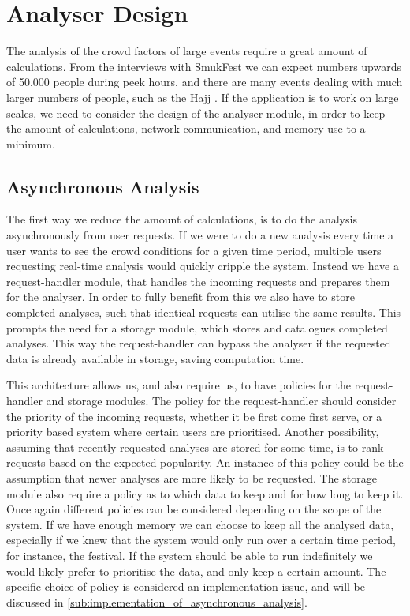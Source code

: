 \section{Analyser Design}\label{s3:analyser_design}

The analysis of the crowd factors of large events require a great amount of calculations. From the interviews with SmukFest we can expect numbers upwards of 50,000 people during peek hours, and there are many events dealing with much larger numbers of people, such as the Hajj \cite{website:Wikipedia-Hajj2}. If the application is to work on large scales, we need to consider the design of the analyser module, in order to keep the amount of calculations, network communication, and memory use to a minimum.

\subsection{Asynchronous Analysis}
\label{sub:Asynchronous_Analysis}

The first way we reduce the amount of calculations, is to do the analysis asynchronously from user requests. If we were to do a new analysis every time a user wants to see the crowd conditions for a given time period, multiple users requesting real-time analysis would quickly cripple the system. Instead we have a request-handler module, that handles the incoming requests and prepares them for the analyser. In order to fully benefit from this we also have to store completed analyses, such that identical requests can utilise the same results. This prompts the need for a storage module, which stores and catalogues completed analyses. This way the request-handler can bypass the analyser if the requested data is already available in storage, saving computation time.

This architecture allows us, and also require us, to have policies for the request-handler and storage modules. The policy for the request-handler should consider the priority of the incoming requests, whether it be first come first serve, or a priority based system where certain users are prioritised. Another possibility, assuming that recently requested analyses are stored for some time, is to rank requests based on the expected popularity. An instance of this policy could be the assumption that newer analyses are more likely to be requested. The storage module also require a policy as to which data to keep and for how long to keep it. Once again different policies can be considered depending on the scope of the system. If we have enough memory we can choose to keep all the analysed data, especially if we knew that the system would only run over a certain time period, for instance, the festival. If the system should be able to run indefinitely we would likely prefer to prioritise the data, and only keep a certain amount. The specific choice of policy is considered an implementation issue, and will be discussed in \cref{sub:implementation_of_asynchronous_analysis}.


